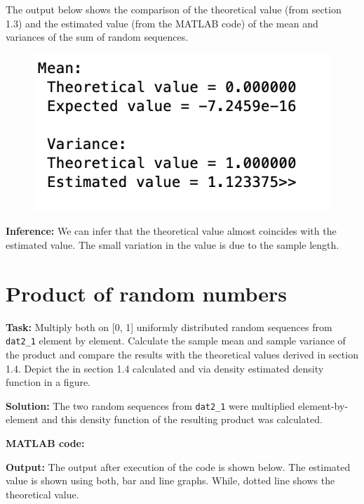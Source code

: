 \noindent The output below shows the comparison of the theoretical value (from section 1.3) and the estimated value (from the MATLAB code) of the mean and variances of the sum of random sequences.
\begin{figure}[H]
\centering
{\includegraphics[scale=0.63]{ass3_2.png}}
\end{figure}

\noindent \textbf{Inference:} We can infer that the theoretical value almost coincides with the estimated value. The small variation in the value is due to the sample length.




\section{ Product of random numbers } \label{ Product of random numbers }
\noindent \textbf{Task:} Multiply both on [0, 1] uniformly distributed random sequences from \texttt{ dat2\_1} element by element. Calculate the sample mean and sample variance of the product and compare the results with the theoretical values derived in section 1.4. Depict the in section 1.4 calculated and via density estimated density function in a figure. 

\noindent \textbf{Solution:} The two random sequences from \texttt{dat2\_1} were multiplied element-by-element and this density function of the resulting product was calculated.

\noindent \textbf{MATLAB code:}

\noindent \textbf{Output:} The output after execution of the code is shown below. The estimated value is shown using both, bar and line graphs. While, dotted line shows the theoretical value.

